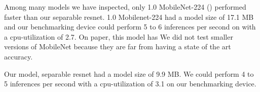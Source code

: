 Among many models we have inspected, only 1.0 MobileNet-224 (\cite{howard2017mobilenets}) performed faster than our separable resnet. 1.0 Mobilenet-224 had a model size of 17.1 MB and our benchmarking device could perform 5 to 6 inferences per second on with a cpu-utilization of 2.7. On paper, this model has  We did not test smaller versions of MobileNet because they are far from having a state of the art accuracy.

Our model, separable resnet had a model size of 9.9 MB. We could perform 4 to 5 inferences per second with a cpu-utilization of 3.1 on our benchmarking device.




